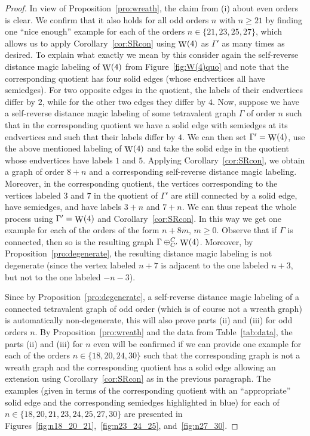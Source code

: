 \documentclass[11 pt,english]{article}
\newcommand{\G}{\Gamma}
\newcommand{\Wr}{\mathop{\rm W}}
\theoremstyle{definition}
\begin{document}
\begin{proof}
In view of Proposition~\ref{pro:wreath}, the claim from (i) about even orders is clear. We confirm that it also holds for all odd orders $n$ with $n \geq 21$ by finding one ``nice enough'' example for each of the orders $n \in \{21, 23, 25, 27\}$, which allows us to apply Corollary~\ref{cor:SRcon} using $\Wr(4)$ as $\G'$ as many times as desired. To explain what exactly we mean by this consider again the self-reverse distance magic labeling of $\Wr(4)$ from Figure~\ref{fig:W(4)quo} and note that the corresponding quotient has four solid edges (whose endvertices all have semiedges). For two opposite edges in the quotient, the labels of their endvertices differ by $2$, while for the other two edges they differ by $4$. Now, suppose we have a self-reverse distance magic labeling of some tetravalent graph $\G$ of order $n$ such that in the corresponding quotient we have a solid edge with semiedges at its endvertices and such that their labels differ by $4$. We can then set $\G' = \Wr(4)$, use the above mentioned labeling of $\Wr(4)$ and take the solid edge in the quotient whose endvertices have labels $1$ and $5$. Applying Corollary~\ref{cor:SRcon}, we obtain a graph of order $8+n$ and a corresponding self-reverse distance magic labeling. Moreover, in the corresponding quotient, the vertices corresponding to the vertices labeled $3$ and $7$ in the quotient of $\G'$ are still connected by a solid edge, have semiedges, and have labels $3+n$ and $7+n$. We can thus repeat the whole process using $\G' = \Wr(4)$ and Corollary~\ref{cor:SRcon}. In this way we get one example for each of the orders of the form $n + 8m$, $m \geq 0$. Observe that if $\G$ is connected, then so is the resulting graph $\G\oplus^{C}_{C'} \Wr(4)$. Moreover, by Proposition~\ref{pro:degenerate}, the resulting distance magic labeling is not degenerate (since the vertex labeled $n+7$ is adjacent to the one labeled $n+3$, but not to the one labeled $-n-3$).

Since by Proposition~\ref{pro:degenerate}, a self-reverse distance magic labeling of a connected tetravalent graph of odd order (which is of course not a wreath graph) is automatically non-degenerate, this will also prove parts (ii) and (iii) for odd orders $n$. By Proposition~\ref{pro:wreath} and the data from Table~\ref{tab:data}, the parts (ii) and (iii) for $n$ even will be confirmed if we can provide one example for each of the orders $n \in \{18, 20, 24, 30\}$ such that the corresponding graph is not a wreath graph and the corresponding quotient has a solid edge allowing an extension using Corollary~\ref{cor:SRcon} as in the previous paragraph. The examples (given in terms of the corresponding quotient with an ``appropriate'' solid edge and the corresponding semiedges highlighted in blue) for each of $n \in \{18,20,21,23,24,25,27,30\}$ are presented in Figures~\ref{fig:n18_20_21},~\ref{fig:n23_24_25}, and~\ref{fig:n27_30}.
\end{proof}
\end{document}
